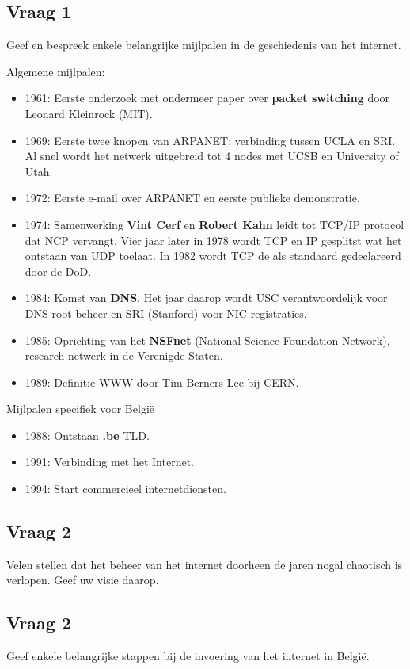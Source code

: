 \documentclass[../main.tex]{subfiles}
\begin{document}
\subsection{Vraag 1}
\begin{question}
Geef en bespreek enkele belangrijke mijlpalen in de geschiedenis van het internet.
\end{question}

\begin{solution}
Algemene mijlpalen:
\begin{itemize}
	\item 1961: Eerste onderzoek met ondermeer paper over \textbf{packet switching} door Leonard Kleinrock (MIT).
	\item 1969: Eerste twee knopen van ARPANET: verbinding tussen UCLA en SRI. Al snel wordt het netwerk uitgebreid tot 4 nodes met UCSB en University of Utah.
	\item 1972: Eerste e-mail over ARPANET en eerste publieke demonstratie.
	\item 1974: Samenwerking \textbf{Vint Cerf} en \textbf{Robert Kahn} leidt tot TCP/IP protocol dat NCP vervangt. Vier jaar later in 1978 wordt TCP en IP gesplitst wat het ontstaan van UDP toelaat. In 1982 wordt TCP de als standaard gedeclareerd door de DoD.
	\item 1984: Komst van \textbf{DNS}. Het jaar daarop wordt USC verantwoordelijk voor DNS root beheer en SRI (Stanford) voor NIC registraties.
	\item 1985: Oprichting van het \textbf{NSFnet} (National Science Foundation Network), research netwerk in de Verenigde Staten.
	\item 1989: Definitie WWW door Tim Berners-Lee bij CERN.
\end{itemize}
Mijlpalen specifiek voor Belgi\"e
\begin{itemize}
	\item 1988: Ontstaan \textbf{.be} TLD.
	\item 1991: Verbinding met het Internet.
	\item 1994: Start commercieel internetdiensten.
\end{itemize}
\end{solution}


\subsection{Vraag 2}
\begin{question}
Velen stellen dat het beheer van het internet doorheen de jaren nogal chaotisch is
verlopen. Geef uw visie daarop.
\end{question}

\begin{solution}

\end{solution}



\subsection{Vraag 2}
\begin{question}
Geef enkele belangrijke stappen bij de invoering van het internet in België.
\end{question}

\begin{solution}

\end{solution}
\end{document}
